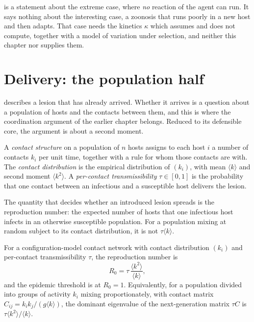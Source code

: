 \begin{remark}
\label{sm:rem-spillover}
 is a statement about the extreme case, where
\emph{no} reaction of the agent can run. It says nothing about the
interesting case, a zoonosis that runs poorly in a new host and then adapts.
That case needs the kinetics $\kappa$ which  assumes and
does not compute, together with a model of variation under selection, and
neither this chapter nor  supplies them.
\end{remark}

\section{Delivery: the population half}
\label{sm:sec:delivery}

 describes a lesion that has already arrived.
Whether it arrives is a question about a population of hosts and the
contacts between them, and this is where the coordination argument of the
earlier chapter belongs. Reduced to its defensible core, the argument is
about a second moment.

\begin{definition}
\label{sm:def-contact}
A \emph{contact structure} on a population of $n$ hosts assigns to each host
$i$ a number of contacts $k_i$ per unit time, together with a rule for whom
those contacts are with. The \emph{contact distribution} is the empirical
distribution of $(k_i)$, with mean $\langle k\rangle$ and second moment
$\langle k^2\rangle$. A \emph{per-contact transmissibility} $\tau\in[0,1]$
is the probability that one contact between an infectious and a susceptible
host delivers the lesion.
\end{definition}

The quantity that decides whether an introduced lesion spreads is the
reproduction number: the expected number of hosts that one infectious host
infects in an otherwise susceptible population. For a population mixing at
random subject to its contact distribution, it is not $\tau\langle k\rangle$.

\begin{theorem}
\label{sm:thm-second-moment}
\lnkS{} For a configuration-model contact network with contact distribution
$(k_i)$ and per-contact transmissibility $\tau$, the reproduction number is
\begin{equation}
R_0=\tau\,\frac{\langle k^2\rangle}{\langle k\rangle},
\label{sm:eq-r0}
\end{equation}
and the epidemic threshold is at $R_0=1$. Equivalently, for a population
divided into groups of activity $k_i$ mixing proportionately, with contact
matrix $C_{ij}=k_ik_j/(g\langle k\rangle)$, the dominant eigenvalue of the
next-generation matrix $\tau C$ is $\tau\langle k^2\rangle/\langle
k\rangle$.
\end{theorem}

